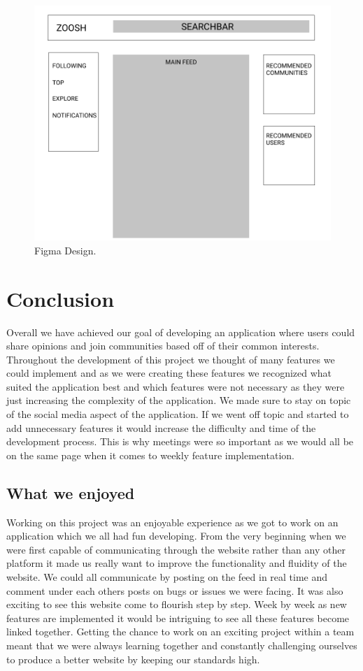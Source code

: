 \begin{figure}[H]
  \centering
  \includegraphics[scale=0.4]{img/FIGMA.PNG}
  \caption{Figma Design.}
  \label{fig:Final Figma design.}
\end{figure}

\chapter{Conclusion}
Overall we have achieved our goal of developing an application where users could share opinions and join communities based off of their common interests. Throughout the development of this project we thought of many features we could implement and as we were creating these features we recognized what suited the application best and which features were not necessary as they were just increasing the complexity of the application. We made sure to stay on topic of the social media aspect of the application. If we went off topic and started to add unnecessary features it would increase the difficulty and time of the development process. This is why meetings were so important as we would all be on the same page when it comes to weekly feature implementation. 

\section{What we enjoyed}
Working on this project was an enjoyable experience as we got to work on an application which we all had fun developing. From the very beginning when we were first capable of communicating through the website rather than any other platform it made us really want to improve the functionality and fluidity of the website. We could all communicate by posting on the feed in real time and comment under each others posts on bugs or issues we were facing. It was also exciting to see this website come to flourish step by step. Week by week as new features are implemented it would be intriguing to see all these features become linked together. Getting the chance to work on an exciting project within a team meant that we were always learning together and constantly challenging ourselves to produce a better website by keeping our standards high.

